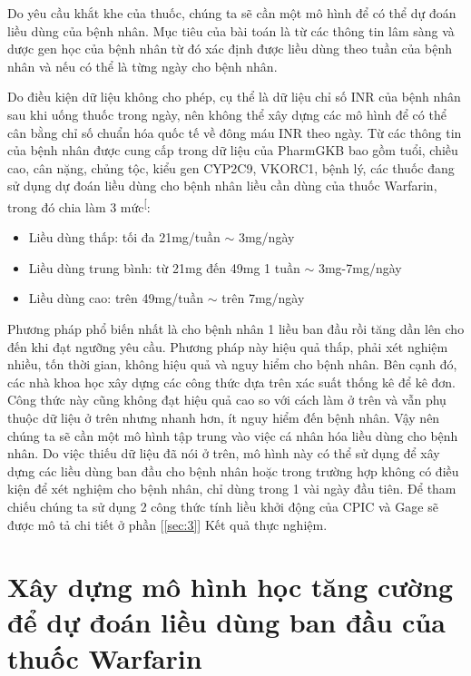 \documentclass[14pt,oneside]{scrbook}
\providecommand{\tightlist}{\setlength{\itemsep}{\smallskipamount}\setlength{\parskip}{\smallskipamount}}
\begin{document}
Do yêu cầu khắt khe của thuốc, chúng ta sẽ cần một mô hình để có thể dự
đoán liều dùng của bệnh nhân. Mục tiêu của bài toán là từ các thông tin
lâm sàng và dược gen học của bệnh nhân từ đó xác định được liều dùng
theo tuần của bệnh nhân và nếu có thể là từng ngày cho bệnh nhân.

Do điều kiện dữ liệu không cho phép, cụ thể là dữ liệu chỉ số INR của
bệnh nhân sau khi uống thuốc trong ngày, nên không thể xây dựng các mô
hình để có thể cân bằng chỉ số chuẩn hóa quốc tế về đông máu INR theo
ngày. Từ các thông tin của bệnh nhân được cung cấp trong dữ liệu của
PharmGKB bao gồm tuổi, chiều cao, cân nặng, chủng tộc, kiểu gen CYP2C9,
VKORC1, bệnh lý, các thuốc đang sử dụng dự đoán liều dùng cho bệnh nhân
liều cần dùng của thuốc Warfarin, trong đó chia làm 3
mức\textsuperscript{{[}\citeproc{ref-base}{7}{]}}:

\begin{itemize}
\tightlist
\item
  Liều dùng thấp: tối đa 21mg/tuần \(\sim\) 3mg/ngày
\item
  Liều dùng trung bình: từ 21mg đến 49mg 1 tuần \(\sim\) 3mg-7mg/ngày
\item
  Liều dùng cao: trên 49mg/tuần \(\sim\) trên 7mg/ngày
\end{itemize}

Phương pháp phổ biến nhất là cho bệnh nhân 1 liều ban đầu rồi tăng dần
lên cho đến khi đạt ngưỡng yêu cầu. Phương pháp này hiệu quả thấp, phải
xét nghiệm nhiều, tốn thời gian, không hiệu quả và nguy hiểm cho bệnh
nhân. Bên cạnh đó, các nhà khoa học xây dựng các công thức dựa trên xác
suất thống kê để kê đơn. Công thức này cũng không đạt hiệu quả cao so
với cách làm ở trên và vẫn phụ thuộc dữ liệu ở trên nhưng nhanh hơn, ít
nguy hiểm đến bệnh nhân. Vậy nên chúng ta sẽ cần một mô hình tập trung
vào việc cá nhân hóa liều dùng cho bệnh nhân. Do việc thiếu dữ liệu đã
nói ở trên, mô hình này có thể sử dụng để xây dựng các liều dùng ban đầu
cho bệnh nhân hoặc trong trường hợp không có điều kiện để xét nghiệm cho
bệnh nhân, chỉ dùng trong 1 vài ngày đầu tiên. Để tham chiếu chúng ta sử
dụng 2 công thức tính liều khởi động của CPIC và Gage sẽ được mô tả chi
tiết ở phần {[}\ref{sec:3}{]} Kết quả thực nghiệm.

\chapter{Xây dựng mô hình học tăng cường để dự đoán liều dùng ban đầu
của thuốc
Warfarin}\label{xuxe2y-dux1ef1ng-muxf4-huxecnh-hux1ecdc-tux103ng-cux1b0ux1eddng-ux111ux1ec3-dux1ef1-ux111ouxe1n-liux1ec1u-duxf9ng-ban-ux111ux1ea7u-cux1ee7a-thuux1ed1c-warfarin}
\end{document}
